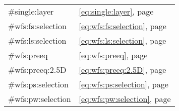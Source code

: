 \begin{tabular}{ll}
    \#single:layer            & \eqref{eq:single:layer},              page \pageref{eq:single:layer} \\
    \#wfs:fs:selection        & \eqref{eq:wfs:fs:selection},          page \pageref{eq:wfs:fs:selection} \\
    \#wfs:ls:selection        & \eqref{eq:wfs:ls:selection},          page \pageref{eq:wfs:ls:selection} \\
    \#wfs:preeq               & \eqref{eq:wfs:preeq},                 page \pageref{eq:wfs:preeq} \\
    \#wfs:preeq:2.5D          & \eqref{eq:wfs:preeq:2.5D},            page \pageref{eq:wfs:preeq:2.5D} \\
    \#wfs:ps:selection        & \eqref{eq:wfs:ps:selection},          page \pageref{eq:wfs:ps:selection} \\
    \#wfs:pw:selection        & \eqref{eq:wfs:pw:selection},          page \pageref{eq:wfs:pw:selection} \\
\end{tabular}
